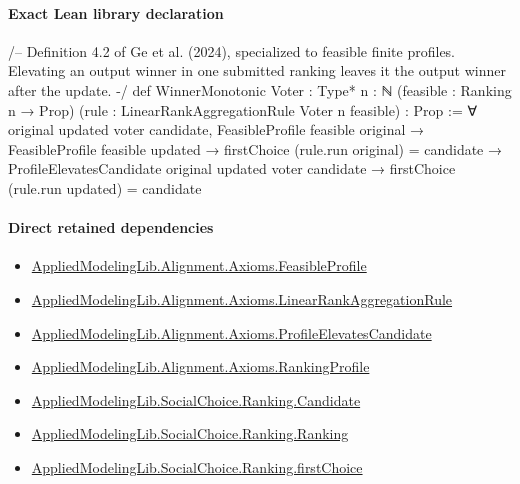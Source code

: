 \documentclass[10pt]{article}
\begin{document}
\paragraph{Exact Lean library declaration}
\begin{ReviewVerbatim}
/--
Definition 4.2 of Ge et al. (2024), specialized to feasible finite profiles.
Elevating an output winner in one submitted ranking leaves it the output
winner after the update.
-/
def WinnerMonotonic {Voter : Type*} {n : ℕ} (feasible : Ranking n → Prop)
    (rule : LinearRankAggregationRule Voter n feasible) : Prop :=
  ∀ original updated voter candidate,
    FeasibleProfile feasible original → FeasibleProfile feasible updated →
      firstChoice (rule.run original) = candidate →
      ProfileElevatesCandidate original updated voter candidate →
        firstChoice (rule.run updated) = candidate
\end{ReviewVerbatim}

\paragraph{Direct retained dependencies}
\begin{itemize}\raggedright
\item \hyperlink{library-prerequisite-5fa7bdb49b050adf}{Applied\allowbreak{}Modeling\allowbreak{}Lib.\allowbreak{}Alignment.\allowbreak{}Axioms.\allowbreak{}Feasible\allowbreak{}Profile}
\item \hyperlink{library-prerequisite-43447e121a1884f9}{Applied\allowbreak{}Modeling\allowbreak{}Lib.\allowbreak{}Alignment.\allowbreak{}Axioms.\allowbreak{}Linear\allowbreak{}Rank\allowbreak{}Aggregation\allowbreak{}Rule}
\item \hyperlink{governing-declaration-b57961a5fb3111d7}{Applied\allowbreak{}Modeling\allowbreak{}Lib.\allowbreak{}Alignment.\allowbreak{}Axioms.\allowbreak{}Profile\allowbreak{}Elevates\allowbreak{}Candidate}
\item \hyperlink{library-prerequisite-9bded048a60dfe0a}{Applied\allowbreak{}Modeling\allowbreak{}Lib.\allowbreak{}Alignment.\allowbreak{}Axioms.\allowbreak{}Ranking\allowbreak{}Profile}
\item \hyperlink{library-prerequisite-8c0e6c25845ae78a}{Applied\allowbreak{}Modeling\allowbreak{}Lib.\allowbreak{}Social\allowbreak{}Choice.\allowbreak{}Ranking.\allowbreak{}Candidate}
\item \hyperlink{library-prerequisite-5cde54446d1ae021}{Applied\allowbreak{}Modeling\allowbreak{}Lib.\allowbreak{}Social\allowbreak{}Choice.\allowbreak{}Ranking.\allowbreak{}Ranking}
\item \hyperlink{governing-declaration-08e457479ee6cf15}{Applied\allowbreak{}Modeling\allowbreak{}Lib.\allowbreak{}Social\allowbreak{}Choice.\allowbreak{}Ranking.\allowbreak{}first\allowbreak{}Choice}
\end{itemize}
\end{document}
